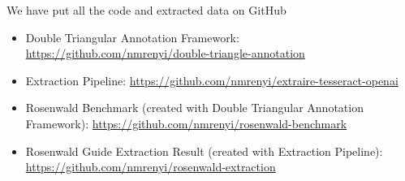 We have put all the code and extracted data on GitHub

\begin{itemize}
    \item Double Triangular Annotation Framework: \url{https://github.com/nmrenyi/double-triangle-annotation}
    \item Extraction Pipeline: \url{https://github.com/nmrenyi/extraire-tesseract-openai}
    \item Rosenwald Benchmark (created with Double Triangular Annotation Framework): \url{https://github.com/nmrenyi/rosenwald-benchmark} 
    \item Rosenwald Guide Extraction Result (created with Extraction Pipeline): \url{https://github.com/nmrenyi/rosenwald-extraction}
\end{itemize}

	